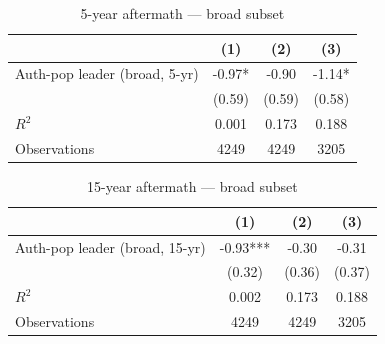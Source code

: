\begin{table}[htbp]\centering
\def\sym#1{\ifmmode^{#1}\else\(^{#1}\)\fi}
\caption{5-year aftermath — broad subset}
\begin{tabular}{l*{3}{c}}
\hline\hline
                    &\multicolumn{1}{c}{(1)}   &\multicolumn{1}{c}{(2)}   &\multicolumn{1}{c}{(3)}   \\
\hline
Auth-pop leader (broad, 5-yr)&       -0.97*  &       -0.90   &       -1.14*  \\
                    &      (0.59)   &      (0.59)   &      (0.58)   \\
\hline
\(R^{2}\)           &       0.001   &       0.173   &       0.188   \\
Observations        &        4249   &        4249   &        3205   \\
\hline\hline
\end{tabular}
\end{table}
\begin{table}[htbp]\centering
\def\sym#1{\ifmmode^{#1}\else\(^{#1}\)\fi}
\caption{15-year aftermath — broad subset}
\begin{tabular}{l*{3}{c}}
\hline\hline
                    &\multicolumn{1}{c}{(1)}   &\multicolumn{1}{c}{(2)}   &\multicolumn{1}{c}{(3)}   \\
\hline
Auth-pop leader (broad, 15-yr)&       -0.93***&       -0.30   &       -0.31   \\
                    &      (0.32)   &      (0.36)   &      (0.37)   \\
\hline
\(R^{2}\)           &       0.002   &       0.173   &       0.188   \\
Observations        &        4249   &        4249   &        3205   \\
\hline\hline
\end{tabular}
\end{table}
